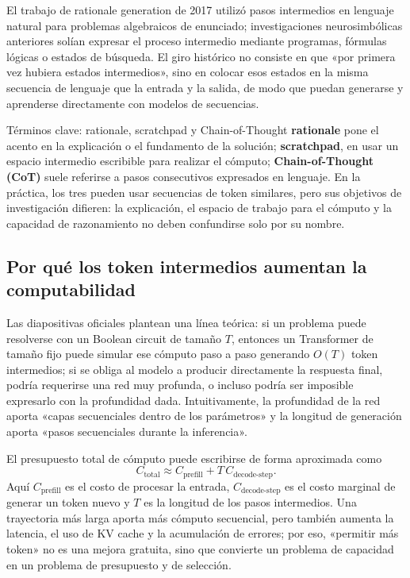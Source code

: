 El trabajo de rationale generation de 2017 utilizó pasos intermedios en lenguaje natural para problemas algebraicos de enunciado; investigaciones neurosimbólicas anteriores solían expresar el proceso intermedio mediante programas, fórmulas lógicas o estados de búsqueda. El giro histórico no consiste en que «por primera vez hubiera estados intermedios», sino en colocar esos estados en la misma secuencia de lenguaje que la entrada y la salida, de modo que puedan generarse y aprenderse directamente con modelos de secuencias.


\begin{knowledgebox}{Términos clave: rationale, scratchpad y Chain-of-Thought}
\textbf{rationale} pone el acento en la explicación o el fundamento de la solución; \textbf{scratchpad}, en usar un espacio intermedio escribible para realizar el cómputo; \textbf{Chain-of-Thought (CoT)} suele referirse a pasos consecutivos expresados en lenguaje. En la práctica, los tres pueden usar secuencias de token similares, pero sus objetivos de investigación difieren: la explicación, el espacio de trabajo para el cómputo y la capacidad de razonamiento no deben confundirse solo por su nombre.
\end{knowledgebox}

\subsection{Por qué los token intermedios aumentan la computabilidad}

Las diapositivas oficiales plantean una línea teórica: si un problema puede resolverse con un Boolean circuit de tamaño $T$, entonces un Transformer de tamaño fijo puede simular ese cómputo paso a paso generando $O(T)$ token intermedios; si se obliga al modelo a producir directamente la respuesta final, podría requerirse una red muy profunda, o incluso podría ser imposible expresarlo con la profundidad dada. Intuitivamente, la profundidad de la red aporta «capas secuenciales dentro de los parámetros» y la longitud de generación aporta «pasos secuenciales durante la inferencia».


El presupuesto total de cómputo puede escribirse de forma aproximada como
\[
C_{\text{total}}\approx C_{\text{prefill}}+T\,C_{\text{decode-step}}.
\]
Aquí $C_{\text{prefill}}$ es el costo de procesar la entrada, $C_{\text{decode-step}}$ es el costo marginal de generar un token nuevo y $T$ es la longitud de los pasos intermedios. Una trayectoria más larga aporta más cómputo secuencial, pero también aumenta la latencia, el uso de KV cache y la acumulación de errores; por eso, «permitir más token» no es una mejora gratuita, sino que convierte un problema de capacidad en un problema de presupuesto y de selección.

